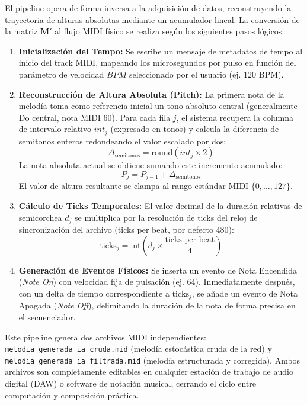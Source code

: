 El pipeline opera de forma inversa a la adquisición de datos, reconstruyendo la trayectoria de alturas absolutas mediante un acumulador lineal. La conversión de la matriz $\mathbf{M}'$ al flujo MIDI físico se realiza según los siguientes pasos lógicos:
\begin{enumerate}
    \item \textbf{Inicialización del Tempo:} Se escribe un mensaje de metadatos de tempo al inicio del track MIDI, mapeando los microsegundos por pulso en función del parámetro de velocidad $BPM$ seleccionado por el usuario (ej. $120$ BPM).
    \item \textbf{Reconstrucción de Altura Absoluta (Pitch):} La primera nota de la melodía toma como referencia inicial un tono absoluto central (generalmente Do central, nota MIDI $60$). Para cada fila $j$, el sistema recupera la columna de intervalo relativo $int_j$ (expresado en tonos) y calcula la diferencia de semitonos enteros redondeando el valor escalado por dos:
    \begin{equation}
        \Delta_{\text{semitonos}} = \text{round}(int_j \times 2)
    \end{equation}
    La nota absoluta actual se obtiene sumando este incremento acumulado:
    \begin{equation}
        P_j = P_{j-1} + \Delta_{\text{semitonos}}
    \end{equation}
    El valor de altura resultante se clampa al rango estándar MIDI $\{0, \dots, 127\}$.
    
    \item \textbf{Cálculo de Ticks Temporales:} El valor decimal de la duración relativas de semicorchea $d_j$ se multiplica por la resolución de ticks del reloj de sincronización del archivo (ticks per beat, por defecto $480$):
    \begin{equation}
        \text{ticks}_j = \text{int}\left( d_j \times \frac{\text{ticks\_per\_beat}}{4} \right)
    \end{equation}
    
    \item \textbf{Generación de Eventos Físicos:} Se inserta un evento de Nota Encendida (\textit{Note On}) con velocidad fija de pulsación (ej. $64$). Inmediatamente después, con un delta de tiempo correspondiente a $\text{ticks}_j$, se añade un evento de Nota Apagada (\textit{Note Off}), delimitando la duración de la nota de forma precisa en el secuenciador.
\end{enumerate}

Este pipeline genera dos archivos MIDI independientes: \texttt{melodia\_generada\_ia\_cruda.mid} (melodía estocástica cruda de la red) y \texttt{melodia\_generada\_ia\_filtrada.mid} (melodía estructurada y corregida). Ambos archivos son completamente editables en cualquier estación de trabajo de audio digital (DAW) o software de notación musical, cerrando el ciclo entre computación y composición práctica.
